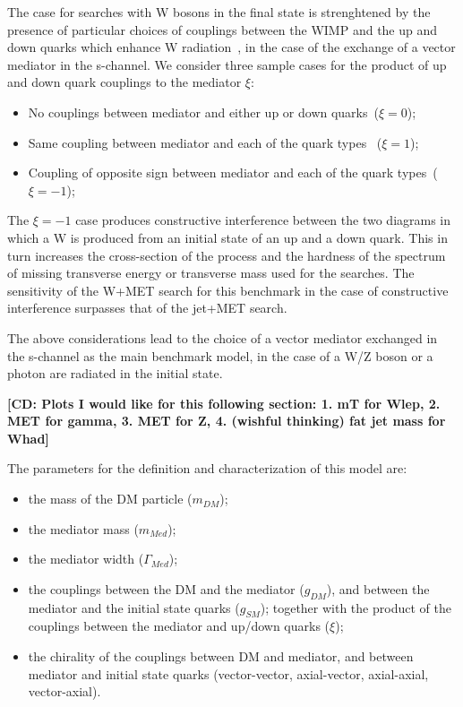 
The case for searches with W bosons in the final state is strenghtened by the 
presence of particular choices of couplings between the WIMP and the up and 
down quarks which enhance W radiation~\citep{Bai:2012xg}, in the case of the exchange
of a vector mediator in the s-channel. 
We consider three sample cases for the product of 
up and down quark couplings to the mediator $\xi$:
\begin{itemize}
 \item No couplings between mediator and either up or down quarks~($\xi=0$);
 \item Same coupling between mediator and each of the quark types~ ($\xi=1$);
 \item Coupling of opposite sign between mediator and each of the quark types~($\xi=-1$);
\end{itemize}

The $\xi=-1$ case produces constructive interference between the two 
diagrams in which a W is produced from an initial state of an up and 
a down quark. This in turn increases the cross-section of the process 
and the hardness of the spectrum of missing transverse energy or 
transverse mass used for the searches. The sensitivity of the W+MET search for 
this benchmark in the case of constructive interference surpasses 
that of the jet+MET search. 

The above considerations lead to the choice of a vector mediator exchanged in the s-channel
as the main benchmark model, in the case of a W/Z boson or a photon are 
radiated in the initial state. 

\textbf{[CD: Plots I would like for this following section:
1. mT for Wlep, 2. MET for gamma, 3. MET for Z, 4. (wishful thinking) fat jet mass for Whad]}

The parameters for the definition and characterization of this model are: 
\begin{itemize}
 \item the mass of the DM particle ($m_{DM}$);
 \item the mediator mass ($m_{Med}$);
 \item the mediator width ($\Gamma_{Med}$);
 \item the couplings between the DM and the mediator ($g_{DM}$), 
 and between the mediator and the initial state quarks ($g_{SM}$);
 together with the product of the couplings between the mediator and up/down quarks ($\xi$);
 \item the chirality of the couplings between DM and mediator, 
 and between mediator and initial state quarks (vector-vector, axial-vector, axial-axial, vector-axial).
\end{itemize}

